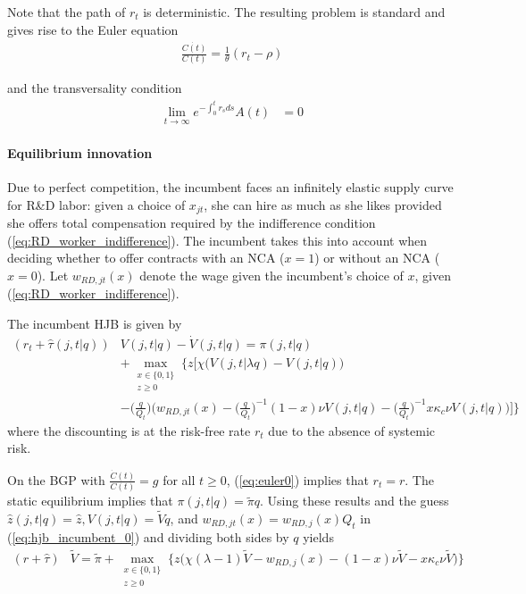 \documentclass[11pt,english]{article}
\theoremstyle{remark}
\begin{document}
Note that the path of $r_t$ is deterministic. The resulting problem is standard and gives rise to the Euler equation 
\begin{align}
\frac{\dot{C(t)}}{C(t)} = \frac{1}{\theta} (r_t - \rho) \label{eq:euler0} 
\end{align}

and the transversality condition
\begin{align}
	\lim_{t \to \infty} e^{-\int_0^t r_s ds} A(t) &= 0 \label{eq:tvc0}
\end{align}

\paragraph{Equilibrium innovation}

Due to perfect competition, the incumbent faces an infinitely elastic supply curve for R\&D labor: given a choice of $x_{jt}$, she can hire as much as she likes provided she offers total compensation required by the indifference condition (\ref{eq:RD_worker_indifference}). The incumbent takes this into account when deciding whether to offer contracts with an NCA ($x = 1$) or without an NCA ($x = 0$). Let $w_{RD,jt}(x)$ denote the  wage given the incumbent's choice of $x$, given (\ref{eq:RD_worker_indifference}).

The incumbent HJB is given by 
\begin{align}
(r_t + \hat{\tau}(j,t|q)) &V(j,t |q) - \dot{V}(j,t|q) = \pi(j,t|q) \nonumber \\_{}
&+ \max_{\substack{x \in \{0,1\} \\ z \ge 0}} \Bigg\{ z \Big[ \chi \big( V(j,t|\lambda q) - V(j,t|q)\big)  \nonumber \\
&- \big(\frac{q}{Q_t}\big) \Big( w_{RD,jt}(x) - \big(\frac{q}{Q_t}\big)^{-1} (1-x) \nu V(j,t|q) -\big(\frac{q}{Q_t}\big)^{-1}  x \kappa_c \nu V(j,t|q) \Big)  \Big] \Bigg\} \label{eq:hjb_incumbent_0}
\end{align}
where the discounting is at the risk-free rate $r_t$ due to the absence of systemic risk. 

On the BGP with $\frac{\dot{C}(t)}{C(t)} = g$ for all $t \ge 0 $, (\ref{eq:euler0}) implies that $r_t = r$. The static equilibrium implies that $\pi(j,t|q) = \tilde{\pi} q$. Using these results and the guess $\hat{z}(j,t|q) = \hat{z}, V(j,t|q) = \tilde{V} q$, and $w_{RD,jt}(x) = w_{RD,j}(x) Q_t$ in (\ref{eq:hjb_incumbent_0}) and dividing both sides by $q$ yields 
\begin{align}
(r + \hat{\tau}) &\tilde{V} = \tilde{\pi} + \max_{\substack{x \in \{0,1\} \\ z \ge 0}} \Bigg\{ z \Big( \chi (\lambda -1) \tilde{V}- w_{RD,j}(x) - (1-x) \nu \tilde{V} - x \kappa_c \nu \tilde{V} \Big)\Bigg\} \label{eq:hjb_incumbent_1}
\end{align}
\end{document}
